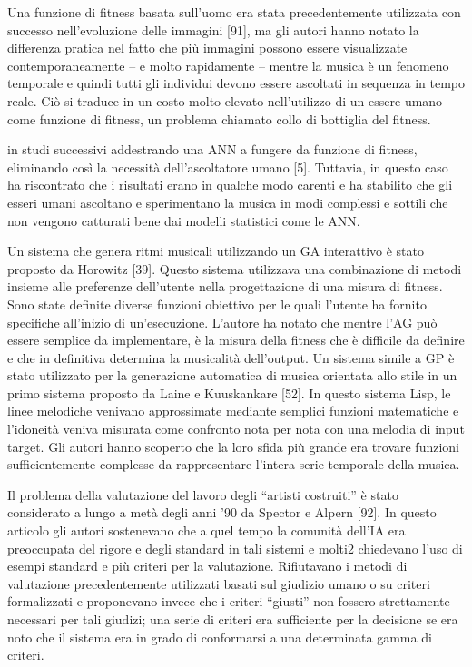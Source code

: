 \documentclass[a4paper,12pt]{report}
\begin{document}
Una funzione di fitness basata sull’uomo era stata precedentemente utilizzata con successo nell’evoluzione delle immagini [91], ma gli autori hanno notato la differenza pratica nel fatto che più immagini possono essere visualizzate contemporaneamente – e molto rapidamente – mentre la musica è un fenomeno temporale e quindi tutti gli individui devono essere ascoltati in sequenza in tempo reale. Ciò si traduce in un costo molto elevato nell’utilizzo di un essere umano come funzione di fitness, un problema chiamato collo di bottiglia del fitness.

in studi successivi addestrando una ANN a fungere da funzione di fitness, eliminando così la necessità dell'ascoltatore umano [5]. Tuttavia, in questo caso ha riscontrato che i risultati erano in qualche modo carenti e ha stabilito che gli esseri umani ascoltano e sperimentano la musica in modi complessi e sottili che non vengono catturati bene dai modelli statistici come le ANN. 

Un sistema che genera ritmi musicali utilizzando un GA interattivo è stato proposto da Horowitz [39]. 
Questo sistema utilizzava una combinazione di metodi insieme alle preferenze dell'utente nella progettazione di una misura di fitness. 
Sono state definite diverse funzioni obiettivo per le quali l'utente ha fornito specifiche all'inizio di un'esecuzione. L'autore ha notato che mentre l'AG può essere semplice da implementare, è la misura della fitness che è difficile da definire e che in definitiva determina la musicalità dell'output. Un sistema simile a GP è stato utilizzato per la generazione automatica di musica orientata allo stile in un primo sistema proposto da Laine e Kuuskankare [52]. In questo sistema Lisp, le linee melodiche venivano approssimate mediante semplici funzioni matematiche e l'idoneità veniva misurata come confronto nota per nota con una melodia di input target. Gli autori hanno scoperto che la loro sfida più grande era trovare funzioni sufficientemente complesse da rappresentare l’intera serie temporale della musica.

Il problema della valutazione del lavoro degli “artisti costruiti” è stato considerato a lungo a metà degli anni ’90 da Spector e Alpern [92]. In questo articolo gli autori sostenevano che a quel tempo la comunità dell’IA era preoccupata del rigore e degli standard in tali sistemi e molti2 chiedevano l’uso di esempi standard e più criteri per la valutazione. Rifiutavano i metodi di valutazione precedentemente utilizzati basati sul giudizio umano o su criteri formalizzati e proponevano invece che i criteri “giusti” non fossero strettamente necessari per tali giudizi; una serie di criteri era sufficiente per la decisione se era noto che il sistema era in grado di conformarsi a una determinata gamma di criteri. 
\end{document}
